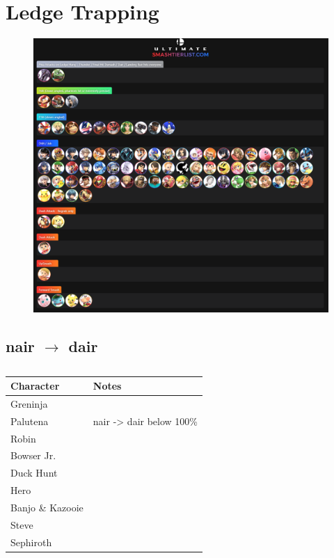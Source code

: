 \section{Ledge Trapping}
\label{sec:ledge-trapping}

\begin{figure}[h]
    \centering
    \caption{}
    \includegraphics[width=.9\linewidth]{images/ledge-hang-tierlist}
    \label{fig:ledge-hang-tierlist}
\end{figure}


\subsection{nair $\rightarrow$ dair}

\begin{table}[h]
    \centering
    \caption{}
    \begin{tabular}{ll}
        \toprule
        \textbf{Character} & \textbf{Notes} \\
        \midrule
        Greninja         & \\
        Palutena         & nair -> dair below 100\% \\
        Robin            & \\
        Bowser Jr.       & \\
        Duck Hunt        & \\
        Hero             & \\
        Banjo \& Kazooie & \\
        Steve            & \\
        Sephiroth        & \\
        \bottomrule
    \end{tabular}
\end{table}

